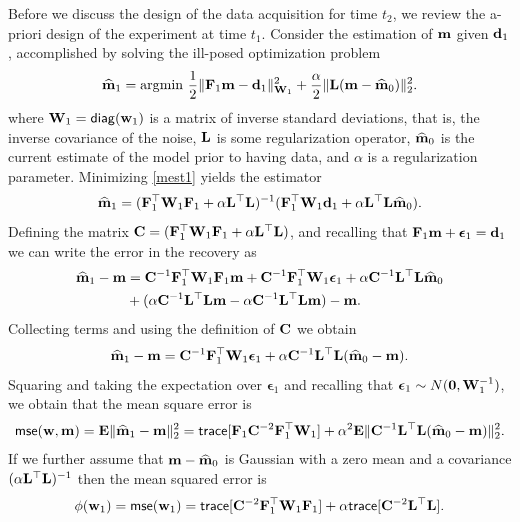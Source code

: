 \documentclass[11pt]{article}
\newcommand{\bfC}	{{\bf{C}}}
\newcommand{\bfE}	{{\bf{E}}}
\newcommand{\bfF}	{{\bf{F}}}
\newcommand{\bfL}	{{\bf{L}}}
\newcommand{\bfW}	{{\bf{W}}}
\newcommand{\bfd}	{{\bf{d}}}
\newcommand{\bfm}	{{\bf{m}}}
\newcommand{\bfw}	{{\bf{w}}}
\newcommand{\hf}        {{\frac 12}}
\newcommand{\bfepsilon} {{\boldsymbol \epsilon}}
\newcommand{\LtL}       { \bfL^{\top}\bfL}
\newcommand {\zero}  { {\bf 0} }
\renewcommand{\hf}		 {\frac12}
\newcommand{\bfmhat}    {{\widehat{\bfm}}}
\begin{document}
Before we discuss the design of the data acquisition for time $t_{2}$,
 we review the a-priori design of the experiment at time $t_{1}$.  
Consider  the estimation of $\bfm$ given $\bfd_{1}$,  accomplished by solving the ill-posed optimization problem
\begin{align}
\label{mest1}
\widehat \bfm_{1} = {\rm arg}{\min} \ \hf \| \bfF_{1} \bfm - \bfd_{1}\|^{2}_{\bfW_{1}} + {\frac {\alpha} 2}
\|\bfL (\bfm - \bfmhat_{0}) \|^{2}_2. 
\end{align}
where $\bfW_{1} = {\sf diag}(\bfw_{1})$ is a matrix of inverse standard deviations, 
that is, the inverse covariance of the noise, $\bfL$ is some regularization operator, $\bfmhat_{0}$ is
the current estimate of the model prior to having data, and $\alpha$ is a regularization parameter.
Minimizing \eqref{mest1} yields the estimator
\begin{align}
\label{mest}
\widehat \bfm_{1} = (\bfF_{1}^{\top} \bfW_{1}\bfF_{1} + \alpha \LtL)^{-1} (\bfF_{1}^{\top} \bfW_{1} \bfd_{1}
+ \alpha \LtL \bfmhat_{0}).
\end{align}
Defining the matrix $\bfC = (\bfF_{1}^{\top} \bfW_{1}\bfF_{1} + \alpha \LtL)$, and recalling that $\bfF_1\bfm + \bfepsilon_1 = \bfd_1$ we can write
the error in the recovery as
\begin{align}
\bfmhat_1 -\bfm &= \bfC^{-1} \bfF_{1}^{\top} \bfW_{1}\bfF_{1} \bfm + \bfC^{-1} \bfF_{1}^{\top} \bfW_{1}\bfepsilon_1 + \alpha
\bfC^{-1} \LtL \bfmhat_{0} \\
\nonumber
&+ (\alpha \bfC^{-1} \LtL\bfm
- \alpha \bfC^{-1} \LtL \bfm) 
 -\bfm.
\end{align}
Collecting terms and using the definition of $\bfC$ we obtain
\begin{align}
\label{diffmod}
\bfmhat_1 -\bfm = \bfC^{-1} \bfF_{1}^{\top} \bfW_{1} \bfepsilon_1 + \alpha \bfC^{-1} \LtL (\bfmhat_{0} - \bfm).
\end{align}
Squaring and taking the expectation over $\bfepsilon_1$ and recalling that $ \bfepsilon_1 \sim N(\zero,\bfW_{1}^{-1})$, we obtain that the mean square error is
\begin{align}
{\sf mse}(\bfw,\bfm) = \bfE\| \bfmhat_1 -\bfm \|^{2}_2 = {\sf trace}[   \bfF_{1} \bfC^{-2} \bfF_{1}^{\top} \bfW_{1}]  + 
\alpha^2 \bfE\| \bfC^{-1} \LtL (\bfmhat_{0} - \bfm) \|^{2}_2.
\end{align}
If we further assume that $\bfm-\bfmhat_{0}$ is Gaussian with a zero mean and a covariance
$(\alpha \LtL)^{-1}$ then the mean squared error is 
\begin{align}
\phi(\bfw_1 ) = {\sf mse}(\bfw_1) = {\sf trace}[    \bfC^{-2} \bfF_{1}^{\top}\bfW_{1}\bfF_{1}]  + 
 \alpha {\sf trace} [\bfC^{-2} \LtL]. 
\end{align}
\end{document}
